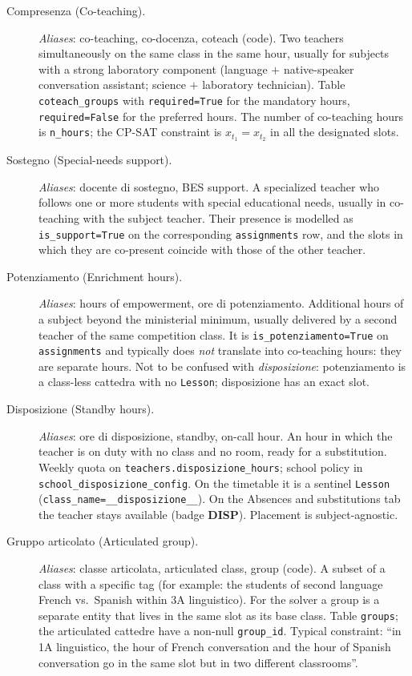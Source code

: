 \begin{description}
\item[Compresenza (Co-teaching).]
  \emph{Aliases}: co-teaching, co-docenza, coteach (code). Two
  teachers simultaneously on the same class in the same hour,
  usually for subjects with a strong laboratory component
  (language $+$ native-speaker conversation assistant; science $+$
  laboratory technician). Table \texttt{coteach\_groups} with
  \texttt{required=True} for the mandatory hours,
  \texttt{required=False} for the preferred hours. The number of
  co-teaching hours is \texttt{n\_hours}; the CP-SAT constraint is
  $x_{t_1} = x_{t_2}$ in all the designated slots.

\item[Sostegno (Special-needs support).]
  \emph{Aliases}: docente di sostegno, BES support. A specialized
  teacher who follows one or more students with special
  educational needs, usually in co-teaching with the subject
  teacher. Their presence is modelled as \texttt{is\_support=True}
  on the corresponding \texttt{assignments} row, and the slots in
  which they are co-present coincide with those of the other
  teacher.

\item[Potenziamento (Enrichment hours).]
  \emph{Aliases}: hours of empowerment, ore di potenziamento.
  Additional hours of a subject beyond the ministerial minimum,
  usually delivered by a second teacher of the same competition
  class. It is \texttt{is\_potenziamento=True} on
  \texttt{assignments} and typically does \emph{not} translate
  into co-teaching hours: they are separate hours. Not to be
  confused with \emph{disposizione}: potenziamento is a
  class-less cattedra with no \texttt{Lesson}; disposizione
  has an exact slot.

\item[Disposizione (Standby hours).]
  \emph{Aliases}: ore di disposizione, standby, on-call hour.
  An hour in which the teacher is on duty with no class and no
  room, ready for a substitution. Weekly quota on
  \texttt{teachers.disposizione\_hours}; school policy in
  \texttt{school\_disposizione\_config}. On the timetable it is
  a sentinel \texttt{Lesson}
  (\texttt{class\_name=\_\_disposizione\_\_}). On the Absences
  and substitutions tab the teacher stays available (badge
  \textbf{DISP}). Placement is subject-agnostic.

\item[Gruppo articolato (Articulated group).]
  \emph{Aliases}: classe articolata, articulated class, group
  (code). A subset of a class with a specific tag (for example:
  the students of second language French vs.\ Spanish within 3A
  linguistico). For the solver a group is a separate entity that
  lives in the same slot as its base class. Table \texttt{groups};
  the articulated cattedre have a non-null \texttt{group\_id}.
  Typical constraint: ``in 1A linguistico, the hour of French
  conversation and the hour of Spanish conversation go in the same
  slot but in two different classrooms''.


\end{description}
